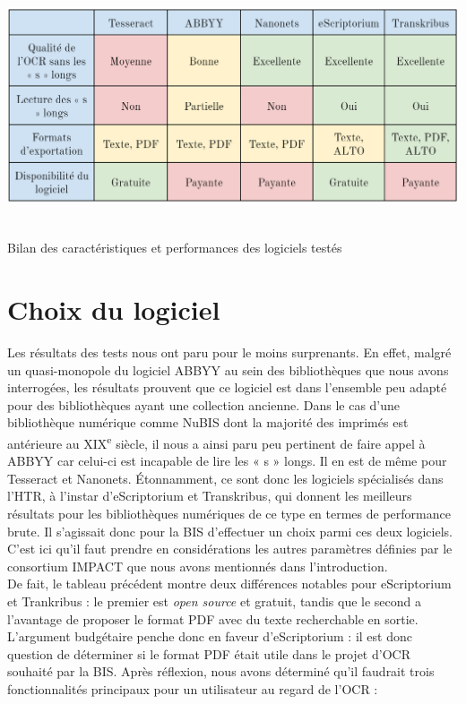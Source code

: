 \documentclass[a4paper,12pt,twoside]{book}
\begin{document}
\begin{table} [H]
	\includegraphics[width=6.26806in,height=2.73611in]{vertopal_157ae480aa4a4b07be198b586a812241/media/image14.png}
	\caption{Bilan des caractéristiques et performances des logiciels testés}
\end{table}


\section{Choix du logiciel}

Les résultats des tests nous ont paru pour le moins surprenants. En
effet, malgré un quasi-monopole du logiciel ABBYY au sein des
bibliothèques que nous avons interrogées, les résultats prouvent que ce
logiciel est dans l'ensemble peu adapté pour des bibliothèques ayant une
collection ancienne. Dans le cas d'une bibliothèque numérique comme
NuBIS dont la majorité des imprimés est antérieure au
XIX\textsuperscript{e} siècle, il nous a ainsi paru peu pertinent de
faire appel à ABBYY car celui-ci est incapable de lire les « s » longs.
Il en est de même pour Tesseract et Nanonets. Étonnamment, ce sont donc
les logiciels spécialisés dans l'HTR, à l'instar d'eScriptorium et
Transkribus, qui donnent les meilleurs résultats pour les bibliothèques
numériques de ce type en termes de performance brute. Il s'agissait donc
pour la BIS d'effectuer un choix parmi ces deux logiciels. C'est ici
qu'il faut prendre en considérations les autres paramètres définies par
le consortium IMPACT que nous avons mentionnés dans l'introduction. \\

De fait, le tableau précédent montre deux différences notables pour
eScriptorium et Trankribus : le premier est \emph{open source} et
gratuit, tandis que le second a l'avantage de proposer le format PDF
avec du texte recherchable en sortie. L'argument
budgétaire penche donc en faveur d'eScriptorium : il est donc question
de déterminer si le format PDF était utile dans le projet d'OCR souhaité
par la BIS. Après réflexion, nous avons déterminé qu'il faudrait trois
fonctionnalités principaux pour un utilisateur au regard de l'OCR : \\
\end{document}

